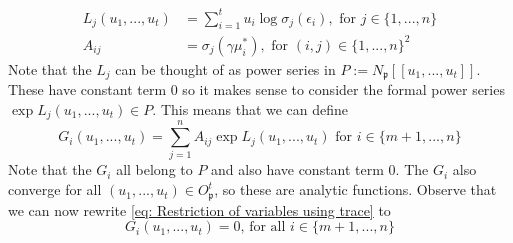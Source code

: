 \documentclass{article}
\newcommand{\mfrak}[1]{\mathfrak{#1}}
\numberwithin{equation}{section}
\begin{document}
\begin{align*}
    L_j(u_1, ..., u_t) & = \sum_{i = 1}^{t} u_i \log \sigma_j(\epsilon_i), \text{ for } j \in \{1, ..., n \} \\
    A_{ij}             & = \sigma_j(\gamma \mu_i^*), \text{ for } (i,j) \in \{1, ..., n\}^2
\end{align*}
Note that the $L_j$ can be thought of as power series in $P := N_\mfrak{p}[[u_1, ..., u_t]]$. These have constant term 0 so it makes sense to consider the formal power series $\exp L_j(u_1, ..., u_t) \in P$. This means that we can define
$$G_i(u_1, ..., u_t) = \sum_{j = 1}^n A_{ij} \exp L_j(u_1, ..., u_t) \text{ for } i \in \{m+1, ..., n \}$$
Note that the $G_i$ all belong to $P$ and also have constant term 0. The $G_i$ also converge for all $(u_1, ..., u_t) \in O_\mfrak p^t$, so these are analytic functions. Observe that we can now rewrite \cref{eq: Restriction of variables using trace} to
\begin{equation}\label{eq: Restriction of variables in terms of power series}
    G_i(u_1, ..., u_t) = 0 \text{, for all } i \in \{m+1, ..., n\}
\end{equation} 
\end{document}
